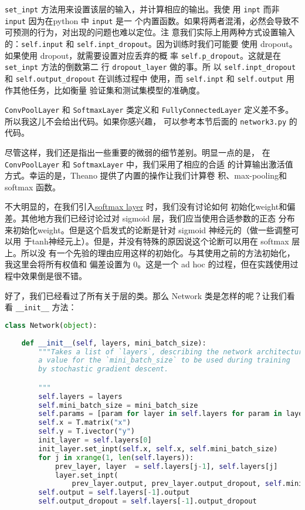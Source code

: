 \lstinline!set_inpt! 方法用来设置该层的输入，并计算相应的输出。我使
用 \lstinline!inpt! 而非 \lstinline!input! 因为在python 中 \lstinline!input! 是一
个内置函数。如果将两者混淆，必然会导致不可预测的行为，对出现的问题也难以定位。注
意我们实际上用两种方式设置输入
的：\lstinline!self.input! 和 \lstinline!self.inpt_dropout!。因为训练时我们可能要
使用 dropout。如果使用 dropout，就需要设置对应丢弃的概
率 \lstinline!self.p_dropout!。这就是在 \lstinline!set_inpt! 方法的倒数第二
行 \lstinline!dropout_layer! 做的事。所
以 \lstinline!self.inpt_dropout! 和 \lstinline!self.output_dropout! 在训练过程中
使用，而 \lstinline!self.inpt! 和 \lstinline!self.output! 用作其他任务，比如衡量
验证集和测试集模型的准确度。

\lstinline!ConvPoolLayer! 和 \lstinline!SoftmaxLayer! 类定义和
\lstinline!FullyConnectedLayer! 定义差不多。所以我这儿不会给出代码。如果你感兴趣，
可以参考本节后面的 \lstinline!network3.py! 的代码。

尽管这样，我们还是指出一些重要的微弱的细节差别。明显一点的是，
在 \lstinline!ConvPoolLayer! 和 \lstinline!SoftmaxLayer! 中，我们采用了相应的合适
的计算输出激活值方式。幸运的是，Theano 提供了内置的操作让我们计算卷
积、max-pooling和 softmax 函数。

不大明显的，在我们引入\hyperref[sec:softmax]{softmax layer} 时，我们没有讨论如何
初始化\gls*{weight}和偏差。其他地方我们已经讨论过对 sigmoid 层，我们应当使用合适参数的正态
分布来初始化\gls*{weight}。但是这个启发式的论断是针对 sigmoid 神经元的（做一些调整可以用
于\gls*{tanh}神经元上）。但是，并没有特殊的原因说这个论断可以用在 softmax 层上。所以没
有一个先验的理由应用这样的初始化。与其使用之前的方法初始化，我这里会将所有权值和
偏差设置为 $0$。这是一个 ad hoc 的过程，但在实践使用过程中效果倒是很不错。

好了，我们已经看过了所有关于层的类。那么 Network 类是怎样的呢？让我们看
看 \lstinline!__init__! 方法：

\begin{lstlisting}[language=Python]
class Network(object):
    
    def __init__(self, layers, mini_batch_size):
        """Takes a list of `layers`, describing the network architecture, and
        a value for the `mini_batch_size` to be used during training
        by stochastic gradient descent.

        """
        self.layers = layers
        self.mini_batch_size = mini_batch_size
        self.params = [param for layer in self.layers for param in layer.params]
        self.x = T.matrix("x")  
        self.y = T.ivector("y")
        init_layer = self.layers[0]
        init_layer.set_inpt(self.x, self.x, self.mini_batch_size)
        for j in xrange(1, len(self.layers)):
            prev_layer, layer  = self.layers[j-1], self.layers[j]
            layer.set_inpt(
                prev_layer.output, prev_layer.output_dropout, self.mini_batch_size)
        self.output = self.layers[-1].output
        self.output_dropout = self.layers[-1].output_dropout
\end{lstlisting}

